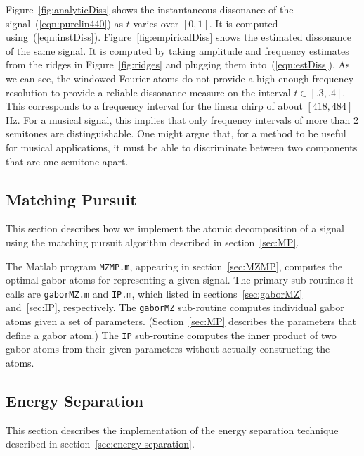 Figure~\ref{fig:analyticDiss} shows the instantaneous dissonance of
the signal~(\ref{eqn:purelin440}) as $t$ varies over $[0,1]$.  It is
computed using~(\ref{eqn:instDiss}).  Figure~\ref{fig:empiricalDiss}
shows the estimated dissonance of the same signal.  It is computed
by taking amplitude and frequency estimates from the ridges in
Figure~\ref{fig:ridges} and plugging them into~(\ref{eqn:estDiss}).
As we can see, the windowed Fourier atoms do not provide a high enough
frequency resolution to provide a reliable dissonance measure on the
interval $t\in[.3,.4]$.  This corresponds to a frequency interval
for the linear chirp of about $[418, 484]$ Hz.  
For a musical
signal, this implies that only frequency intervals of more than 2
semitones are distinguishable.  One might argue that, for a method to
be useful for musical applications, it must be able to discriminate 
between two components that are one semitone apart.  

\subsection{Matching Pursuit}
\label{sec:Practical-MP}
This section describes how we implement the atomic decomposition
of a signal using the matching pursuit algorithm described in
section~\ref{sec:MP}.  

The Matlab program {\tt MZMP.m}, appearing in section~\ref{sec:MZMP},
computes the optimal gabor atoms for representing a given signal.  
The primary sub-routines it calls are {\tt gaborMZ.m} and {\tt IP.m},
which listed in sections~\ref{sec:gaborMZ} and~\ref{sec:IP},
respectively.  The {\tt gaborMZ} sub-routine computes individual
gabor atoms given a set of parameters.  (Section~\ref{sec:MP}
describes the parameters that define a gabor atom.)  The {\tt IP}
sub-routine computes the inner product of two gabor atoms from
their given parameters without actually constructing the atoms.

\subsection{Energy Separation}
\label{sec:Practical-energy-separation}
This section describes the implementation of the energy separation
technique described in section~\ref{sec:energy-separation}.

